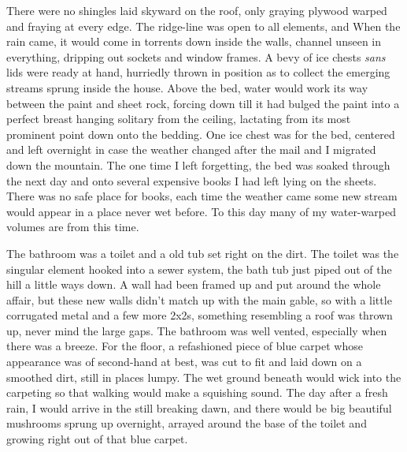 \documentclass[ebook, 10pt, openright, onecolumn]{memoir}
\begin{document}
There were no shingles laid skyward on the roof, only graying plywood warped
and fraying at every edge.  The ridge-line was open to all elements, and When
the rain came, it would come in torrents down inside the walls, channel unseen
in everything, dripping out sockets and window frames.  A bevy of ice chests
\textit{sans} lids were ready at hand, hurriedly thrown in position as to
collect the emerging streams sprung inside the house.  Above the bed, water
would work its way between the paint and sheet rock, forcing down till it had
bulged the paint into a perfect breast hanging solitary from the ceiling,
lactating from its most prominent point down onto the bedding.  One ice chest
was for the bed, centered and left overnight in case the weather changed after
the mail and I migrated down the mountain.  The one time I left forgetting, the
bed was soaked through the next day and onto several expensive books I had left
lying on the sheets.  There was no safe place for books, each time the weather
came some new stream would appear in a place never wet before.  To this day many
of my water-warped volumes are from this time. 

The bathroom was a toilet and a old tub set right on the dirt.  The toilet was
the singular element hooked into a sewer system, the bath tub just piped out of
the hill a little ways down.  A wall had been framed up and put around the whole
affair, but these new walls didn't match up with the main gable, so with a
little corrugated metal and a few more 2x2s, something resembling a roof was
thrown up, never mind the large gaps.  The bathroom was well vented, especially
when there was a breeze.  For the floor, a refashioned piece of blue carpet
whose appearance was of second-hand at best, was cut to fit and laid down on a
smoothed dirt, still in places lumpy.  The wet ground beneath would wick into
the carpeting so that walking would make a squishing sound.  The day after a
fresh rain, I would arrive in the still breaking dawn, and there would be big
beautiful mushrooms sprung up overnight, arrayed around the base of the toilet
and growing right out of that blue carpet.
\end{document}
